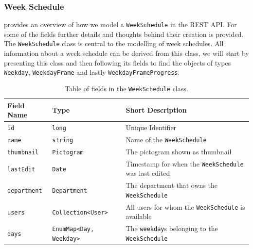 \subsubsection{Week Schedule}
 provides an overview of how we model a \texttt{WeekSchedule} in the REST API.
For some of the fields further details and thoughts behind their creation is provided.
The \texttt{WeekSchedule} class is central to the modelling of week schedules.
All information about a week schedule can be derived from this class, we will start by presenting this class and then following its fields to find the objects of types \texttt{Weekday}, \texttt{WeekdayFrame} and lastly \texttt{WeekdayFrameProgress}.

\begin{table}[H]
    \footnotesize
    \centering
    \begin{tabularx}{\textwidth}{ l l X }
        \textbf{Field Name} & \textbf{Type}                                     & \textbf{Short Description}                                    \\
        \midrule
        \texttt{id}         & \texttt{long}                                     & Unique Identifier                                             \\
        \texttt{name}       & \texttt{string}                                   & Name of the \texttt{WeekSchedule}                             \\
        \texttt{thumbnail}  & \texttt{Pictogram}                                & The pictogram shown as thumbnail                              \\
        \texttt{lastEdit}   & \texttt{Date}                                     & Timestamp for when the \texttt{WeekSchedule} was last edited  \\
        \texttt{department} & \texttt{Department}                               & The department that owns the \texttt{WeekSchedule}            \\
        \texttt{users}      & \texttt{Collection\textless User\textgreater}     & All users for whom the \texttt{WeekSchedule} is available     \\
        \texttt{days}       & \texttt{EnumMap\textless Day, Weekday\textgreater}     & The \texttt{weekday}s belonging to the \texttt{WeekSchedule}
    \end{tabularx}
    \caption{Table of fields in the \texttt{WeekSchedule} class.}
    \label{tbl:WeekSchedule}
\end{table}
